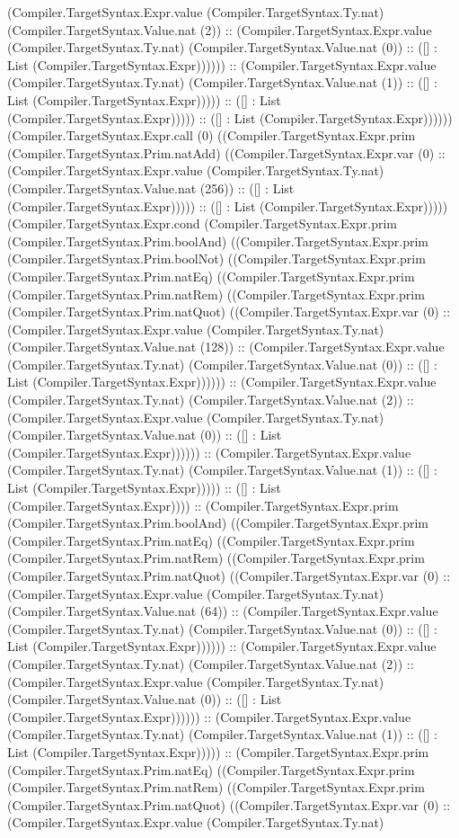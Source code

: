 \documentclass[11pt]{article}
\begin{document}
(Compiler.TargetSyntax.Expr.value (Compiler.TargetSyntax.Ty.nat) (Compiler.TargetSyntax.Value.nat (2)) :: (Compiler.TargetSyntax.Expr.value (Compiler.TargetSyntax.Ty.nat) (Compiler.TargetSyntax.Value.nat (0)) :: ([] : List (Compiler.TargetSyntax.Expr)))))) :: (Compiler.TargetSyntax.Expr.value (Compiler.TargetSyntax.Ty.nat) (Compiler.TargetSyntax.Value.nat (1)) :: ([] : List (Compiler.TargetSyntax.Expr))))) :: ([] : List (Compiler.TargetSyntax.Expr))))) :: ([] : List (Compiler.TargetSyntax.Expr)))))) (Compiler.TargetSyntax.Expr.call (0) ((Compiler.TargetSyntax.Expr.prim (Compiler.TargetSyntax.Prim.natAdd) ((Compiler.TargetSyntax.Expr.var (0) :: (Compiler.TargetSyntax.Expr.value (Compiler.TargetSyntax.Ty.nat) (Compiler.TargetSyntax.Value.nat (256)) :: ([] : List (Compiler.TargetSyntax.Expr))))) :: ([] : List (Compiler.TargetSyntax.Expr))))) (Compiler.TargetSyntax.Expr.cond (Compiler.TargetSyntax.Expr.prim (Compiler.TargetSyntax.Prim.boolAnd) ((Compiler.TargetSyntax.Expr.prim (Compiler.TargetSyntax.Prim.boolNot) ((Compiler.TargetSyntax.Expr.prim (Compiler.TargetSyntax.Prim.natEq) ((Compiler.TargetSyntax.Expr.prim (Compiler.TargetSyntax.Prim.natRem) ((Compiler.TargetSyntax.Expr.prim (Compiler.TargetSyntax.Prim.natQuot) ((Compiler.TargetSyntax.Expr.var (0) :: (Compiler.TargetSyntax.Expr.value (Compiler.TargetSyntax.Ty.nat) (Compiler.TargetSyntax.Value.nat (128)) :: (Compiler.TargetSyntax.Expr.value (Compiler.TargetSyntax.Ty.nat) (Compiler.TargetSyntax.Value.nat (0)) :: ([] : List (Compiler.TargetSyntax.Expr)))))) :: (Compiler.TargetSyntax.Expr.value (Compiler.TargetSyntax.Ty.nat) (Compiler.TargetSyntax.Value.nat (2)) :: (Compiler.TargetSyntax.Expr.value (Compiler.TargetSyntax.Ty.nat) (Compiler.TargetSyntax.Value.nat (0)) :: ([] : List (Compiler.TargetSyntax.Expr)))))) :: (Compiler.TargetSyntax.Expr.value (Compiler.TargetSyntax.Ty.nat) (Compiler.TargetSyntax.Value.nat (1)) :: ([] : List (Compiler.TargetSyntax.Expr))))) :: ([] : List (Compiler.TargetSyntax.Expr)))) :: (Compiler.TargetSyntax.Expr.prim (Compiler.TargetSyntax.Prim.boolAnd) ((Compiler.TargetSyntax.Expr.prim (Compiler.TargetSyntax.Prim.natEq) ((Compiler.TargetSyntax.Expr.prim (Compiler.TargetSyntax.Prim.natRem) ((Compiler.TargetSyntax.Expr.prim (Compiler.TargetSyntax.Prim.natQuot) ((Compiler.TargetSyntax.Expr.var (0) :: (Compiler.TargetSyntax.Expr.value (Compiler.TargetSyntax.Ty.nat) (Compiler.TargetSyntax.Value.nat (64)) :: (Compiler.TargetSyntax.Expr.value (Compiler.TargetSyntax.Ty.nat) (Compiler.TargetSyntax.Value.nat (0)) :: ([] : List (Compiler.TargetSyntax.Expr)))))) :: (Compiler.TargetSyntax.Expr.value (Compiler.TargetSyntax.Ty.nat) (Compiler.TargetSyntax.Value.nat (2)) :: (Compiler.TargetSyntax.Expr.value (Compiler.TargetSyntax.Ty.nat) (Compiler.TargetSyntax.Value.nat (0)) :: ([] : List (Compiler.TargetSyntax.Expr)))))) :: (Compiler.TargetSyntax.Expr.value (Compiler.TargetSyntax.Ty.nat) (Compiler.TargetSyntax.Value.nat (1)) :: ([] : List (Compiler.TargetSyntax.Expr))))) :: (Compiler.TargetSyntax.Expr.prim (Compiler.TargetSyntax.Prim.natEq) ((Compiler.TargetSyntax.Expr.prim (Compiler.TargetSyntax.Prim.natRem) ((Compiler.TargetSyntax.Expr.prim (Compiler.TargetSyntax.Prim.natQuot) ((Compiler.TargetSyntax.Expr.var (0) :: (Compiler.TargetSyntax.Expr.value (Compiler.TargetSyntax.Ty.nat) 
\end{document}
